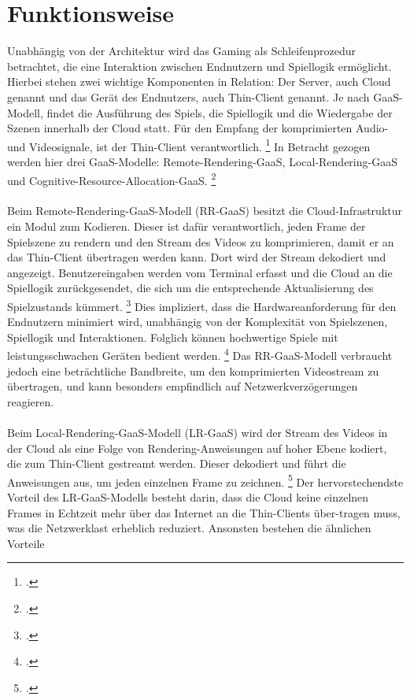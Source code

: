 \documentclass[12pt,toc=bib,toc=listof]{scrreprt}
\begin{document}
\section{Funktionsweise}
\label{sec:Funktionsweise}

Unabhängig von der Architektur wird das Gaming als Schleifenprozedur betrachtet, die eine Interaktion zwischen Endnutzern und Spiellogik ermöglicht. 
Hierbei stehen zwei wichtige Komponenten in Relation: Der Server, auch Cloud genannt und das Gerät des Endnutzers, auch Thin-Client genannt. Je nach GaaS-Modell, 
findet die Ausführung des Spiels, die Spiellogik und die Wiedergabe der Szenen innerhalb der Cloud statt. Für den Empfang der komprimierten Audio- und Videosignale, 
ist der Thin-Client verantwortlich. \footcite [Vgl.] [] {Zadtootaghaj.2022} In Betracht gezogen werden hier drei GaaS-Modelle: Remote-Rendering-GaaS, Local-Rendering-GaaS 
und Cognitive-Resource-Allocation-GaaS. \footcite [Vgl.] [] {Cai.2014}
\\ \\
Beim Remote-Rendering-GaaS-Modell (RR-GaaS) besitzt die Cloud-Infrastruktur ein Modul zum Kodieren. Dieser ist dafür verantwortlich, jeden Frame der Spielszene zu 
rendern und den Stream des Videos zu komprimieren, damit er an das Thin-Client übertragen werden kann. Dort wird der Stream dekodiert und angezeigt. Benutzereingaben 
werden vom Terminal erfasst und die Cloud an die Spiellogik zurückgesendet, die sich um die entsprechende Aktualisierung des Spielzustands kümmert. \footcite [Vgl.] [] {Dangelo.2015}
Dies impliziert, dass die Hardwareanforderung für den Endnutzern minimiert wird, unabhängig von der Komplexität von Spielszenen, Spiellogik und Interaktionen. Folglich können hochwertige 
Spiele mit leistungsschwachen Geräten bedient werden. \footcite [Vgl.] [] {Cai.2014} Das RR-GaaS-Modell verbraucht jedoch eine beträchtliche Bandbreite, um den komprimierten Videostream 
zu übertragen, und kann besonders empfindlich auf Netzwerkverzögerungen reagieren.
\\ \\
Beim Local-Rendering-GaaS-Modell (LR-GaaS) wird der Stream des Videos in der Cloud als eine Folge von Rendering-Anweisungen auf hoher Ebene kodiert, die zum Thin-Client gestreamt werden. 
Dieser dekodiert und führt die Anweisungen aus, um jeden einzelnen Frame zu zeichnen. \footcite [Vgl.] [] {Dangelo.2015} Der hervorstechendste Vorteil des LR-GaaS-Modells besteht darin, dass 
die Cloud keine einzelnen Frames in Echtzeit mehr über das Internet an die Thin-Clients über-tragen muss, was die Netzwerklast erheblich reduziert. Ansonsten bestehen die ähnlichen Vorteile 
\end{document}
